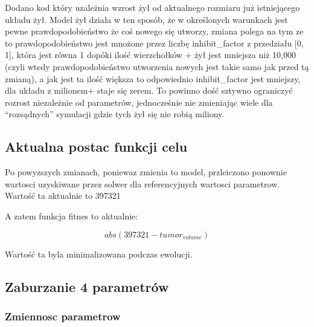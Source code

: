 \documentclass[]{article}
\begin{document}
Dodano kod który uzależnia wzrost żył od aktualnego rozmiaru już
istniejącego układu żył. Model żył działa w ten sposób, że w określonych
warunkach jest pewne prawdopodobieństwo że coś nowego się utworzy,
zmiana polega na tym ze to prawdopodobieństwo jest mnożone przez liczbę
inhibit\_factor z przedziału {[}0, 1{]}, która jest równa 1 dopóki ilość
wierzchołków + żył jest mniejsza niż 10,000 (czyli wtedy
prawdopodobieństwo utworzenia nowych jest takie samo jak przed tą
zmianą), a jak jest ta ilość większa to odpowiednio inhibit\_factor jest
mniejszy, dla układu z milionem+ staje się zerem. To powinno dość
sztywno ograniczyć rozrost niezależnie od parametrów, jednocześnie nie
zmieniając wiele dla ``rozsądnych'' symulacji gdzie tych żył się nie
robią miliony.

\subsection{Aktualna postac funkcji
celu}\label{aktualna-postac-funkcji-celu}

Po powyzszych zmianach, poniewaz zmienia to model, przleiczono ponownie
wartosci uzyskiwane przez solwer dla referencyjnych wartosci parametrow.
Wartość ta aktualnie to 397321

A zatem funkcja fitnes to aktualnie:

\begin{equation}
abs(397321-tumor_{volume})
 \end{equation}

Wartość ta byla minimalizowana podczas ewolucji.

\newpage

\subsection{Zaburzanie 4 parametrów}\label{zaburzanie-4-parametruxf3w}

\subsubsection{Zmiennosc parametrow}\label{zmiennosc-parametrow}
\end{document}
